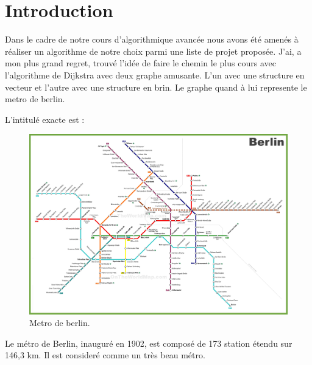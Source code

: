 \section*{Introduction} %

Dans le cadre de notre cours d'algorithmique avancée nous avons été amenés à réaliser un algorithme de notre choix parmi une liste de projet proposée. J'ai, a mon plus grand regret, trouvé l'idée de faire le chemin le plus cours avec l'algorithme de Dijkstra avec deux graphe amusante. L'un avec une structure en vecteur et l'autre avec une structure en brin. Le graphe quand à lui represente le metro de berlin.

L'intitulé exacte est :
\smallbreak
{}

\begin{figure}[h]
\centerline{\includegraphics[width=1\textwidth]{images/metro.jpg}}
\caption{\label{legende} Metro de berlin.
}
\end{figure}

\smallbreak

Le métro de Berlin, inauguré en 1902, est composé de 173 station étendu sur 146,3 km. Il est consideré comme un très beau métro.

